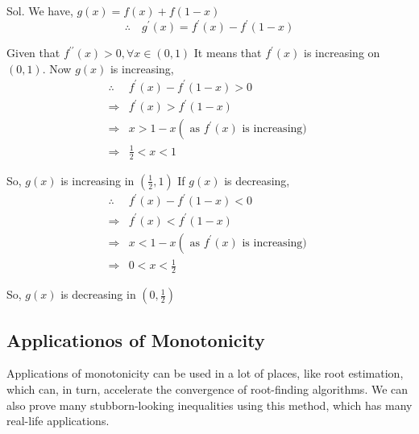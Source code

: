 \begin{enumerate}
\begin{outline}
    Sol. We have, $g(x)=f(x)+f(1-x)$
$$
\therefore \quad g^{\prime}(x)=f^{\prime}(x)-f^{\prime}(1-x)
$$

Given that $f^{\prime \prime}(x)>0, \forall x \in(0,1)$
It means that $f^{\prime}(x)$ is increasing on $(0,1)$.
Now $g(x)$ is increasing,
$$
\begin{array}{ll}
\therefore & f^{\prime}(x)-f^{\prime}(1-x)>0 \\
\Rightarrow & f^{\prime}(x)>f^{\prime}(1-x) \\
\Rightarrow & x>1-x\left(\text { as } f^{\prime}(x)\right. \text { is increasing) } \\
\Rightarrow & \frac{1}{2}<x<1
\end{array}
$$

So, $g(x)$ is increasing in $\left(\frac{1}{2}, 1\right)$
If $g(x)$ is decreasing,
$$
\begin{array}{ll}
\therefore & f^{\prime}(x)-f^{\prime}(1-x)<0 \\
\Rightarrow & f^{\prime}(x)<f^{\prime}(1-x) \\
\Rightarrow & x<1-x\left(\text { as } f^{\prime}(x)\right. \text { is increasing) } \\
\Rightarrow & 0<x<\frac{1}{2}
\end{array}
$$

So, $g(x)$ is decreasing in $\left(0, \frac{1}{2}\right)$

\end{outline}
\end{enumerate}


\subsection{Applicationos of Monotonicity}

Applications of monotonicity can be used in a lot of places, like root estimation, which can, in turn, accelerate the convergence of root-finding algorithms. We can also prove many stubborn-looking inequalities using this method, which has many real-life applications.

